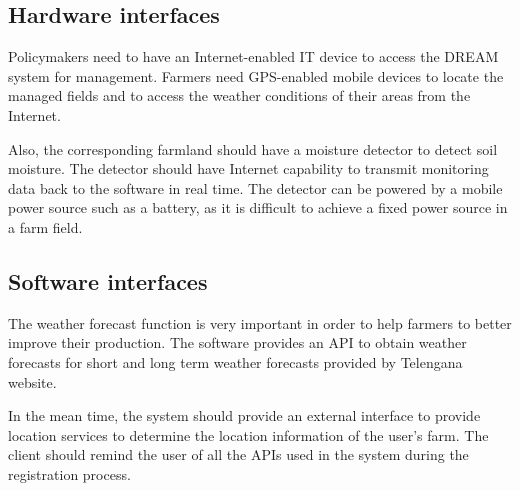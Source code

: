 \documentclass[../../main.tex]{subfiles}
\begin{document}
\subsection{Hardware interfaces}

Policymakers need to have an Internet-enabled IT device to access the DREAM system for management. Farmers need GPS-enabled mobile devices to locate the managed fields and to access the weather conditions of their areas from the Internet. 

Also, the corresponding farmland should have a moisture detector to detect soil moisture. The detector should have Internet capability to transmit monitoring data back to the software in real time. The detector can be powered by a mobile power source such as a battery, as it is difficult to achieve a fixed power source in a farm field.

\subsection{Software interfaces}

The weather forecast function is very important in order to help farmers to better improve their production. The software provides an API to obtain weather forecasts for short and long term weather forecasts provided by Telengana website. 

In the mean time, the system should provide an external interface to provide location services to determine the location information of the user's farm. The client should remind the user of all the APIs used in the system during the registration process.
\end{document}
